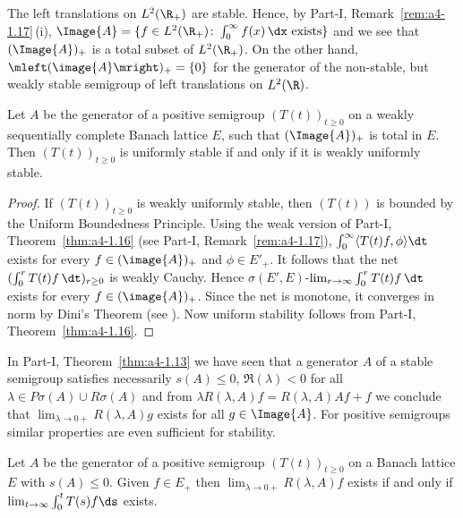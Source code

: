 The left translations on $L^{2}(\R_{+})$ are stable.
Hence, by Part-I, Remark~\ref{rem:a4-1.17}\,(i), $\Image{A} = \{f \in L^{2}(\R_{+}) \colon \int_{0}^{\infty} f(x) \, \dx \text{ exists}\}$ and we see that $(\Image{A})_{+}$ is a total subset of\/ $L^{2}(\R_{+})$.
On the other hand, $\mleft(\image{A}\mright)_{+} = \{0\}$ for the generator of the non-stable, but weakly stable semigroup of left translations on $L^{2}(\R)$.
\begin{proposition}\label{prop:c4-1.7}
%
Let $A$ be the generator of a positive semigroup $(T(t))_{t\geq 0}$ on a weakly sequentially complete Banach lattice $E$, such that $(\Image{A})_{+}$ is total in $E$.
Then $(T(t))_{t\geq 0}$ is uniformly stable if and only if it is weakly uniformly stable.
\end{proposition}
\begin{proof}
If\/ $(T(t))_{t\geq 0}$ is weakly uniformly stable, then $(T(t))$ is bounded by the Uniform Boundedness Principle.
Using the weak version of Part-I, Theorem~\ref{thm:a4-1.16} (see Part-I, Remark~\ref{rem:a4-1.17}), 
$\int_{0}^{\infty} \langle T(t)f,\phi \rangle \dt$ exists for every $f \in (\image{A})_{+}$ and $\phi \in E'_{+}$.
It follows that the net $(\int_{0}^{r} T(t)f \, \dt)_{r\geq 0}$ is weakly Cauchy.
Hence $\sigma(E',E)$-$\lim_{r \to \infty} \int_{0}^{r} T(t)f \, \dt$ exists for every $f \in (\image{A})_{+}$.
Since the net is monotone, it converges in norm by Dini's Theorem (see \textcite [II. Theorem~5.9]{schaefer:1974}).
Now uniform stability follows from Part-I, Theorem~\ref{thm:a4-1.16}.
\end{proof}
In Part-I, Theorem~\ref{thm:a4-1.13} we have seen that a generator $A$ of a stable semigroup satisfies necessarily $s(A) \leq 0$, $\Re(\lambda) < 0$ for all $\lambda \in P{\sigma}(A) \cup R{\sigma}(A)$ and from $\lambda R(\lambda,A)f = R(\lambda,A)Af + f$ we conclude that $\lim_{\lambda \to 0+} R(\lambda,A)g$ exists for all $g \in \Image{A}$. 
For positive semigroups similar properties are even sufficient for stability.
\begin{lemma}\label{lem:c4-1.8}
%
Let $A$ be the generator of a positive semigroup $(T(t))_{t\geq 0}$ on a Banach lattice $E$ with $s(A) \leq 0$.
Given $f \in E_{+}$ then $\lim_{\lambda \to 0+} R(\lambda,A)f$ exists if and only if\/ $\lim_{t \to \infty} \int_{0}^{t} T(s)f \ds$ exists.
\end{lemma}
